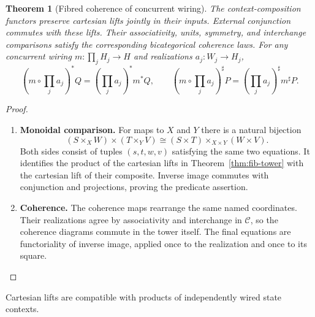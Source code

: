\documentclass[11pt,a4paper]{article}
\numberwithin{equation}{section}
\newtheorem{theorem}{Theorem}[section]
\theoremstyle{definition}
\theoremstyle{remark}
\theoremstyle{plain}
\begin{document}
\begin{theorem}[Fibred coherence of concurrent wiring]
\label{thm:fib-wiring}
The context-composition functors preserve cartesian lifts jointly in
their inputs. External conjunction commutes with these lifts. Their
associativity, units, symmetry, and interchange comparisons satisfy
the corresponding bicategorical coherence laws. For any concurrent
wiring $m:\prod_jH_j\to H$ and realizations $a_j:W_j\to H_j$,
\[
 (m\circ\textstyle\prod_ja_j)^*Q
   =(\textstyle\prod_ja_j)^*m^*Q,
 \qquad
 (m\circ\textstyle\prod_ja_j)^\sharp P
   =(\textstyle\prod_ja_j)^\sharp m^\sharp P.
\]
\end{theorem}
\begin{proof}
\leavevmode
\begin{enumerate}[label=\textup{(\arabic*)},leftmargin=*,itemsep=4pt,topsep=3pt]
  \item \textbf{Monoidal comparison.} For maps to $X$ and $Y$ there is a natural bijection
\[
 (S\times_XW)\times(T\times_YV)
 \cong (S\times T)\times_{X\times Y}(W\times V).
\]
Both sides consist of tuples $(s,t,w,v)$ satisfying the same two
equations. It identifies the product of the cartesian lifts in
Theorem~\ref{thm:fib-tower} with the cartesian lift of their composite. Inverse image commutes with conjunction and projections, proving the
predicate assertion.
  \item \textbf{Coherence.} The coherence maps rearrange the same named
coordinates. Their realizations agree by associativity and interchange
in $\mathcal C$, so the coherence diagrams commute in the tower itself. The final equations are functoriality of inverse image, applied once to
the realization and once to its square.
\end{enumerate}
\end{proof}

\noindent Cartesian lifts are compatible with products of independently wired state contexts.
\begin{center}
\end{center}
\end{document}
